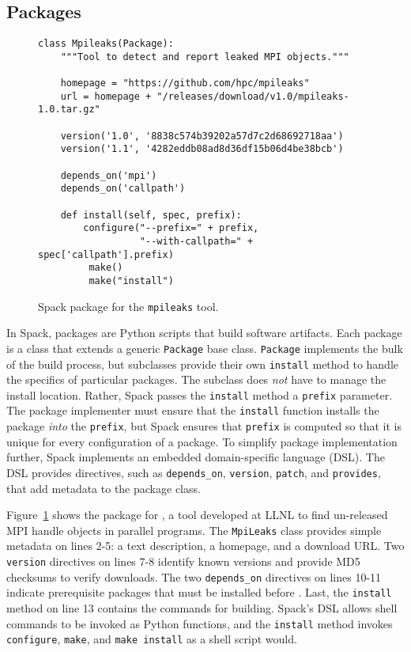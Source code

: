 
\subsection{Packages}\label{sec:packages}

\begin{figure}
\begin{verbatim}
class Mpileaks(Package):
    """Tool to detect and report leaked MPI objects."""

    homepage = "https://github.com/hpc/mpileaks"
    url = homepage + "/releases/download/v1.0/mpileaks-1.0.tar.gz"

    version('1.0', '8838c574b39202a57d7c2d68692718aa')
    version('1.1', '4282eddb08ad8d36df15b06d4be38bcb')

    depends_on('mpi')
    depends_on('callpath')

    def install(self, spec, prefix):
        configure("--prefix=" + prefix,
                  "--with-callpath=" + spec['callpath'].prefix)
         make()
         make("install")
\end{verbatim}
	\caption{
		Spack package for the {\tt mpileaks} tool.
		\label{fig:mpileaks}
	}
\end{figure}

In Spack, packages are Python scripts that build software artifacts.
Each package is a class that extends a generic {\tt Package}
base class.  {\tt Package} implements the bulk of the build process, but
subclasses provide their own {\tt install} method to handle the
specifics of particular packages. The subclass does {\it not} have to
manage the install location.  Rather, Spack passes the {\tt install}
method a {\tt prefix} parameter.  The package implementer must ensure that
the {\tt install} function installs the package {\it into} the {\tt prefix},
but Spack ensures that {\tt prefix} is computed so that it is
unique for every configuration of a package.  To simplify package 
implementation further, Spack implements an embedded domain-specific
language (DSL).
The DSL provides directives, such as {\tt depends\_on},
{\tt version}, {\tt patch}, and {\tt provides}, that add metadata
to the package class.

Figure~\ref{fig:mpileaks} shows the package for \mpileaks, a tool developed
at LLNL to find un-released MPI handle objects in parallel programs.
The {\tt MpiLeaks} class provides simple metadata on lines 2-5: a text
description, a homepage, and a download URL.
Two {\tt version} directives on lines 7-8 identify known versions and provide
MD5 checksums to verify downloads.
The two {\tt depends\_on} directives on lines 10-11 indicate prerequisite
packages that must be installed before \mpileaks.
Last, the {\tt install} method on line 13 contains the commands for building.
Spack's DSL allows shell commands to be invoked as Python functions,
and the {\tt install} method invokes {\tt configure},
{\tt make}, and {\tt make install} as a shell script would.

